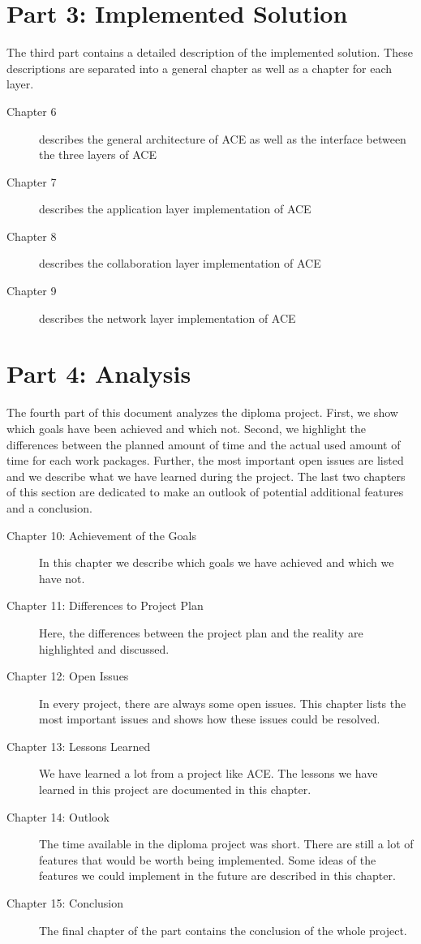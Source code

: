  
\section{Part 3: Implemented Solution}
The third part contains a detailed description of the implemented solution.
These descriptions are separated into a general chapter as well as a
chapter for each layer.

\begin{description}
 \item[Chapter 6] describes the general architecture of ACE as well as the
                   interface between the three layers of ACE
 \item[Chapter 7] describes the application layer implementation of ACE
 \item[Chapter 8] describes the collaboration layer implementation of ACE
 \item[Chapter 9] describes the network layer implementation of ACE
\end{description}

 
\section{Part 4: Analysis}
The fourth part of this document analyzes the diploma project. First, we
show which goals have been achieved and which not. Second, we highlight
the differences between the planned amount of time and the actual used
amount of time for each work packages. Further, the most important open
issues are listed and we describe what we have learned during the project.
The last two chapters of this section are dedicated to make an outlook
of potential additional features and a conclusion.

\begin{description}
 \item[Chapter 10: Achievement of the Goals] In this chapter we describe which goals we have achieved and which we have not.
 \item[Chapter 11: Differences to Project Plan] Here, the differences between the project plan and the reality are highlighted and discussed.
 \item[Chapter 12: Open Issues] In every project, there are always some open issues. This chapter lists the most important issues and shows how these issues could be resolved.
 \item[Chapter 13: Lessons Learned] We have learned a lot from a project like ACE. The lessons we have learned in this project are documented in this chapter.
 \item[Chapter 14: Outlook] The time available in the diploma project was short. There are still a lot of features that would be worth being implemented. Some ideas of the features we could implement in the future are described in this chapter.
 \item[Chapter 15: Conclusion] The final chapter of the part contains the conclusion of the whole project.
\end{description}
 
